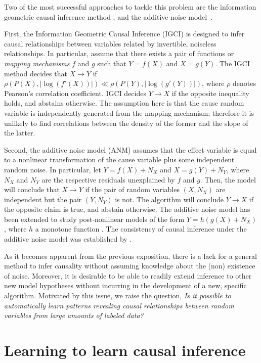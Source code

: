 \documentclass[twoside,11pt,a4paper]{article}
\begin{document}
Two of the most successful approaches to tackle this problem are the
information geometric causal inference method \citep{Daniusis12,Janzing14}, and
the additive noise model~\citep{Hoyer09,Peters14:ANM}. 

First, the Information Geometric Causal Inference (IGCI) is designed to infer
causal relationships between variables related by invertible, noiseless
relationships.  In particular, assume that there exists a pair of functions or
\emph{mapping mechanisms} $f$ and $g$ such that $Y = f(X)$ and $X = g(Y)$. The
IGCI method decides that $X \rightarrow Y$ if $\rho(P(X),|\log(f'(X))|) \ll
\rho(P(Y),|\log(g'(Y))|)$, where $\rho$ denotes Pearson's correlation coefficient.
IGCI decides $Y \rightarrow X$ if the opposite inequality holds, and abstains
otherwise.  The assumption here is that the cause random variable is
independently generated from the mapping mechanism; therefore it is unlikely to
find correlations between the density of the former and the slope of the latter. 

Second, the additive noise model (ANM) assumes that the effect variable is
equal to a nonlinear transformation of the cause variable plus some independent
random noise. In particular, let $Y = f(X) + N_X$ and $X = g(Y) + N_Y$, where
$N_X$ and $N_Y$ are the respective residuals unexplained by $f$ and $g$.  Then,
the model will conclude that $X \rightarrow Y$ if the pair of random variables
$(X, N_X)$ are independent but the pair $(Y, N_Y)$ is not.  The algorithm will
conclude $Y \rightarrow X$ if the opposite claim is true, and abstain
otherwise. The additive noise model has been extended to study post-nonlinear
models of the form $Y = h(g(X)+N_X)$, where $h$ a monotone function
\citep{Zhang09}. The consistency of causal inference under the additive noise
model was established by \citet{Kpotufe13}.

As it becomes apparent from the previous exposition, there is a lack for a
general method to infer causality without assuming knowledge about
the (non) existence of noise.  Moreover, it is desirable to be able to readily
extend inference to other new model hypotheses without incurring in the
development of a new, specific algorithm. Motivated by this issue, we raise the
question, \emph{Is it possible to automatically learn patterns revealing causal
relationships between random variables from large amounts of labeled data?}

\section{Learning to learn causal inference}
\end{document}

